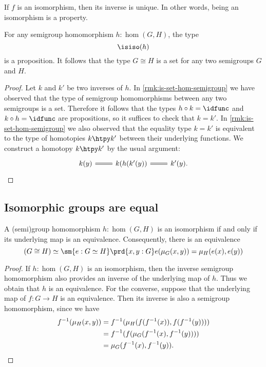 If $f$ is an isomorphism, then its inverse is unique. In other words, being an isomorphism is a property.

\begin{lem}
  For any semigroup homomorphism $h:\hom(G,H)$, the type
  \begin{equation*}
    \isiso(h)
  \end{equation*}
  is a proposition. It follows that the type $G\cong H$ is a set for any two semigroups $G$ and $H$.
\end{lem}

\begin{proof}
  Let $k$ and $k'$ be two inverses of $h$. In \cref{rmk:is-set-hom-semigroup} we have observed that the type of semigroup homomorphisms between any two semigroups is a set. Therefore it follows that the types $h\circ k=\idfunc$ and $k\circ h=\idfunc$ are propositions, so it suffices to check that $k=k'$. In \cref{rmk:is-set-hom-semigroup} we also observed that the equality type $k=k'$ is equivalent to the type of homotopies $k\htpy k'$ between their underlying functions. We construct a homotopy $k\htpy k'$ by the usual argument:
  \begin{equation*}
    \begin{tikzcd}
      k(y) \arrow[r,equals] & k(h(k'(y)) \arrow[r,equals] & k'(y).
    \end{tikzcd}\qedhere
  \end{equation*}
\end{proof}

\subsection{Isomorphic groups are equal}

\begin{lem}\label{lem:grp_iso}
  A (semi)group homomorphism $h:\hom(G,H)$ is an isomorphism if and only if its underlying map is an equivalence. Consequently, there is an equivalence
  \begin{equation*}
    (G\cong H)\simeq \sm{e:G\simeq H}\prd{x,y:G}e(\mu_G(x,y))=\mu_H(e(x),e(y))
  \end{equation*}
\end{lem}

\begin{proof}
  If $h:\hom(G,H)$ is an isomorphism, then the inverse semigroup homomorphism also provides an inverse of the underlying map of $h$. Thus we obtain that $h$ is an equivalence. For the converse, suppose that the underlying map of $f:G\to H$ is an equivalence. Then its inverse is also a semigroup homomorphism, since we have
  \begin{align*}
    f^{-1}(\mu_H(x,y)) & = f^{-1}(\mu_H(f(f^{-1}(x)),f(f^{-1}(y)))) \\
               & = f^{-1}(f(\mu_G(f^{-1}(x),f^{-1}(y)))) \\
               & = \mu_G(f^{-1}(x),f^{-1}(y)). \qedhere
  \end{align*}
\end{proof}

